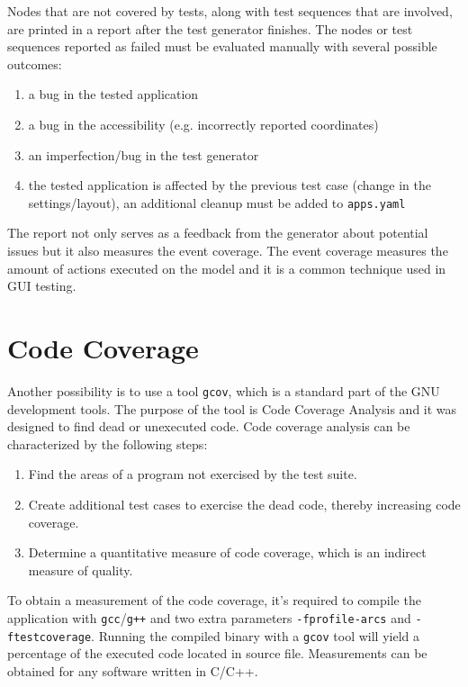 Nodes that are not covered by tests, along with test sequences that are involved, are printed in a report after the test generator finishes.  The nodes or test sequences reported as failed must be evaluated manually with several possible outcomes:
\begin{enumerate}
    \item a bug in the tested application
    \item a bug in the accessibility (e.g. incorrectly reported coordinates)
    \item an imperfection/bug in the test generator
    \item the tested application is affected by the previous test case (change in the settings/layout), an additional cleanup must be added to \texttt{apps.yaml}
\end{enumerate}
The report not only serves as a feedback from the generator about potential issues but it also measures the event coverage. The event coverage measures the amount of actions executed on the model and it is a common technique used in GUI testing\cite{NguyenBao2014Gait}.

\section{Code Coverage}
Another possibility is to use a tool \verb|gcov|, which is a standard part of the GNU development tools. The purpose of the tool is Code Coverage Analysis and it was designed to find dead or unexecuted code. Code coverage analysis can be characterized by the following steps: 
\begin{enumerate}
  \item Find the areas of a program not exercised by the test suite.
  \item Create additional test cases to exercise the dead code, thereby increasing code coverage.
  \item Determine a quantitative measure of code coverage, which is an indirect measure of quality.
\end{enumerate}

To obtain a measurement of the code coverage, it's required to compile the application with \verb|gcc|/\verb|g++| and two extra parameters \verb|-fprofile-arcs| and \verb|-ftestcoverage|. Running the compiled binary with a \verb|gcov| tool will yield a percentage of the executed code located in source file. Measurements can be obtained for any software written in C/C++.\cite{gcov} 

